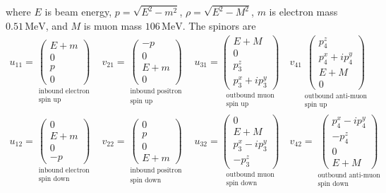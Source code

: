 \documentclass[12pt]{article}
\begin{document}
\noindent
where $E$ is beam energy, $p=\sqrt{E^2-m^2}$, $\rho=\sqrt{E^2-M^2}$,
$m$ is electron mass $0.51\,\text{MeV}$,
and $M$ is muon mass $106\,\text{MeV}$.
The spinors are
\begin{gather*}
u_{11}=
\underset{\substack{\text{inbound electron}\\\text{spin up}}}{
\begin{pmatrix}E+m\\0\\p\\0\end{pmatrix}}
\quad
v_{21}=
\underset{\substack{\text{inbound positron}\\\text{spin up}}}{
\begin{pmatrix}-p\\0\\E+m\\0\end{pmatrix}}
\quad
u_{31}=
\underset{\substack{\text{outbound muon}\\\text{spin up}}}{
\begin{pmatrix}E+M\\0\\p_3^z\\p_3^x+ip_3^y\end{pmatrix}}
\quad
v_{41}
\underset{\substack{\text{outbound anti-muon}\\\text{spin up}}}{
\begin{pmatrix}p_4^z\\p_4^x+ip_4^y\\E+M\\0\end{pmatrix}}
\\[1ex]
u_{12}=
\underset{\substack{\text{inbound electron}\\\text{spin down}}}{
\begin{pmatrix}0\\E+m\\0\\-p\end{pmatrix}}
\quad
v_{22}=
\underset{\substack{\text{inbound positron}\\\text{spin down}}}{
\begin{pmatrix}0\\p\\0\\E+m\end{pmatrix}}
\quad
u_{32}=
\underset{\substack{\text{outbound muon}\\\text{spin down}}}{
\begin{pmatrix}0\\E+M\\p_3^x-ip_3^y\\-p_3^z\end{pmatrix}}
\quad
v_{42}=
\underset{\substack{\text{outbound anti-muon}\\\text{spin down}}}{
\begin{pmatrix}p_4^x-ip_4^y\\-p_4^z\\0\\E+M\end{pmatrix}}
\end{gather*}
\end{document}
